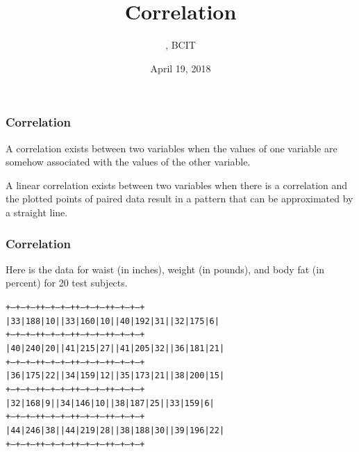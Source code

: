 \documentclass[xcolor=dvipsnames]{beamer}
\title{Correlation}
\subtitle{{\CourseNumber}, BCIT}
\author{\CourseName}
\date{April 19, 2018}
\begin{document}
\begin{frame}
  \titlepage
\end{frame}

\begin{frame}
  \frametitle{Correlation}
  A \alert{correlation} exists between two variables when the values of
  one variable are somehow associated with the values of the other
  variable.

  \bigskip

    A \alert{linear correlation} exists between two variables when
    there is a correlation and the plotted points of paired data
    result in a pattern that can be approximated by a straight line.
\end{frame}

\begin{frame}
  \frametitle{Correlation}
  Here is the data for waist (in inches), weight (in pounds), and body
  fat (in percent) for 20 test subjects.


\begin{alltt}
\scriptsize
+---+---+--++---+---+---++---+---+---++---+---+--+\newline
| 33|188|10|| 33|160| 10|| 40|192| 31|| 32|175| 6|\newline
+---+---+--++---+---+---++---+---+---++---+---+--+\newline
| 40|240|20|| 41|215| 27|| 41|205| 32|| 36|181|21|\newline
+---+---+--++---+---+---++---+---+---++---+---+--+\newline
| 36|175|22|| 34|159| 12|| 35|173| 21|| 38|200|15|\newline
+---+---+--++---+---+---++---+---+---++---+---+--+\newline
| 32|168| 9|| 34|146| 10|| 38|187| 25|| 33|159| 6|\newline
+---+---+--++---+---+---++---+---+---++---+---+--+\newline
| 44|246|38|| 44|219| 28|| 38|188| 30|| 39|196|22|\newline
+---+---+--++---+---+---++---+---+---++---+---+--+
\end{alltt}
\end{frame}
\end{document}
